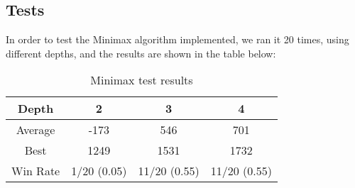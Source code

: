 \documentclass{article}
\begin{document}
\subsection{Tests}

In order to test the Minimax algorithm implemented, we ran it 20 times, using different depths, and the results are shown in the table below: \\

\begin{table}[ht]
  \begin{center}
  \begin{tabular}{||c||c|c|c||}
    \hline
    Depth & 2 & 3 & 4 \\
    \hline\hline
    Average &  -173 &  546 &  701 \\
    \hline\hline
    Best & 1249 & 1531 & 1732 \\
    \hline\hline
    Win Rate & 1/20 (0.05) & 11/20 (0.55) & 11/20 (0.55) \\
    \hline
  \end{tabular}
  \caption{Minimax test results}
  \label{tab:minimax}
  \end{center}
\end{table}
\end{document}
